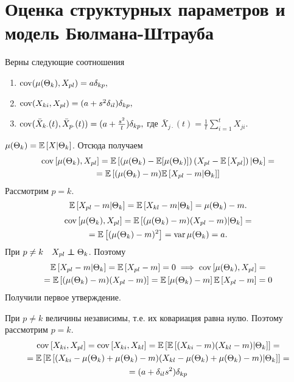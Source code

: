 \chapter{Оценка структурных параметров и модель Бюлмана-Штрауба}

\problem{}
Верны следующие соотношения 
\begin{enumerate}
    \item $\operatorname*{cov}(\mu(\Theta_k),X_{pl})=a\delta_{kp},$ 
    \item $\operatorname*{cov}(X_{ki}, X_{pl})=(a+s^2\delta_{il})\delta_{kp},$
    \item $\operatorname*{cov}(\bar{X}_{k\cdot}(t), \bar{X}_{p\cdot}(t))=(a+\frac{s^2}{t})\delta_{kp},$ где $\bar{X}_{j\cdot}(t)=\frac{1}{t}\sum_{i=1}^t X_{ji}$. 
\end{enumerate} 

\solution{}
\partsol{}
$\mu(\Theta_k) = \mathbb{E}\left[X\vert\Theta_k\right]$. Отсюда получаем
\begin{multline}
    \operatorname*{cov}\left[\mu(\Theta_k), X_{pl}\right] = \mathbb{E}\left[\left(\mu(\Theta_k)-\mathbb{E}[\mu(\Theta_k)]\right)\left(X_{pl}-\mathbb{E}\left[X_{pl}\right]\right)\vert\Theta_k\right] = \\ = 
    \mathbb{E}\left[(\mu(\Theta_k) - m)\mathbb{E}\left[X_{pl} - m\vert\Theta_k\right]\right]
\end{multline}
Рассмотрим $p = k$.
\begin{equation}
    \mathbb{E}\left[X_{pl}-m\vert\Theta_k\right] = \mathbb{E}\left[X_{kl}-m\vert\Theta_k\right] =\mu(\Theta_k) - m.
\end{equation}
\begin{multline}
    \operatorname*{cov}\left[\mu(\Theta_k), X_{pl}\right] = \mathbb{E}\left[(\mu(\Theta_k) - m)(X_{pl} - m)\vert\Theta_k\right] =\\= \mathbb{E}\left[(\mu(\Theta_k) - m)^2\right] = \operatorname*{var} \mu(\Theta_k) = a.
\end{multline}
При $p\neq k \quad X_{pl}\perp\!\!\!\!\perp \Theta_k$. Поэтому
\begin{multline}
    \mathbb{E}\left[X_{pl}-m \vert \Theta_k\right] = \mathbb{E}\left[X_{pl} - m\right] = 0\implies
    \operatorname*{cov}\left[\mu(\Theta_k), X_{pl}\right] = \\=\mathbb{E}\left[(\mu(\Theta_k) - m)(X_{pl} - m)\right] = \mathbb{E}\left[\mu(\Theta_k) - m\right] \mathbb{E}\left[X_{pl} - m\right]  = 0
\end{multline}
Получили первое утверждение. 

\partsol{}
При $p \neq k$ величины независимы, т.е. их ковариация равна нулю. Поэтому рассмотрим $p = k$.
\begin{multline}
    \operatorname*{cov}\left[X_{ki}, X_{pl}\right] =\operatorname*{cov}\left[X_{ki}, X_{kl}\right] = \mathbb{E}\left[\mathbb{E}\left[(X_{ki} - m)(X_{kl} - m)|\Theta_k\right]\right] = \\= 
    \mathbb{E}\left[\mathbb{E}\left[(X_{ki} -\mu(\Theta_k)+\mu(\Theta_k)- m)(X_{kl}-\mu(\Theta_k)+\mu(\Theta_k) - m)\vert \Theta_k\right]\right] = \\ = (a+\delta_{il}s^2)\delta_{kp}
\end{multline}

